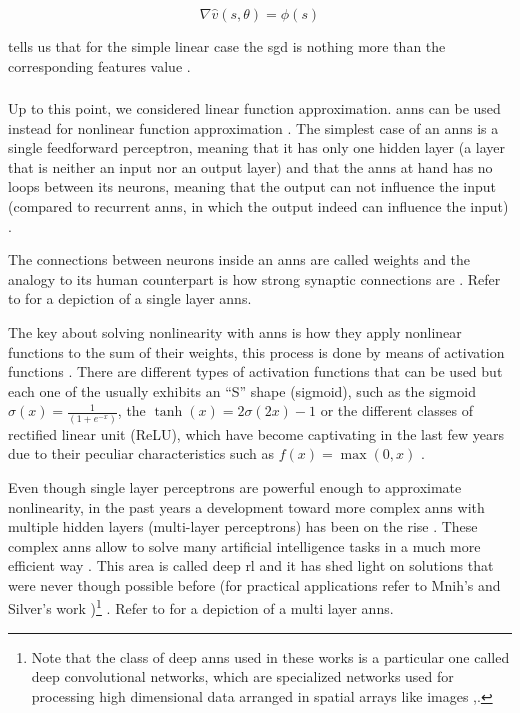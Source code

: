 \documentclass{seal_thesis}
\begin{document}
\begin{equation}
\label{eq:sgd_linear}
	\nabla \hat{v} (s,\theta) = \phi (s)
\end{equation}

 tells us that for the simple linear case the \gls{sgd} is nothing more than the corresponding features value  \cite[p. 199]{Sutton2017}.

\subsubsection{}

Up to this point, we considered linear function approximation. \glspl{ann} can be used instead for nonlinear function approximation \cite[p. 199]{Sutton2017}. The simplest case of an \glspl{ann} is a single feedforward perceptron, meaning that it has only one hidden layer (\ie a layer that is neither an input nor an output layer) and that the \glspl{ann} at hand has no loops between its neurons, meaning that the output can not influence the input (compared to recurrent \glspl{ann}, in which the output indeed can influence the input) \cite[p. 216]{Sutton2017}. 

The connections between neurons inside an \glspl{ann} are called weights and the analogy to its human counterpart is how strong synaptic connections are \cite[p. 216]{Sutton2017}. Refer to  for a depiction of a single layer \glspl{ann}.

The key about solving nonlinearity with \glspl{ann} is how they apply nonlinear functions to the sum of their weights, this process is done by means of activation functions \cite[p. 216]{Sutton2017}. There are different types of activation functions that can be used but each one of the usually exhibits an ``S'' shape (\ie sigmoid), such as the sigmoid $\sigma(x) = \frac{1}{(1+e^{-x})}$, the $\tanh(x) = 2\sigma(2x)-1$ or the different classes of rectified linear unit (ReLU), which have become captivating in the last few years due to their peculiar characteristics such as $f(x) = \max(0,x)$ \cite[p. 216]{Sutton2017}.


Even though single layer perceptrons are powerful enough to approximate nonlinearity, in the past years a development toward more complex \glspl{ann} with multiple hidden layers (\ie multi-layer perceptrons) has been on the rise \cite[p. 217]{Sutton2017}. These complex \glspl{ann} allow to solve many artificial intelligence tasks in a much more efficient way \cite{Bengio2009}. This area is called deep \gls{rl} and it has shed light on solutions that were never though possible before (for practical applications refer to Mnih's \cite{Mnih2015} and Silver's work \cite{Silver2016})\footnote{Note that the class of deep \glspl{ann} used in these works is a particular one called deep convolutional networks, which are specialized networks used for processing high dimensional data arranged in spatial arrays like images \cite[p. 219]{Sutton2017},\cite{Lecun1998}.} \cite{Bengio2009}. Refer to  for a depiction of a multi layer \glspl{ann}.
\end{document}
